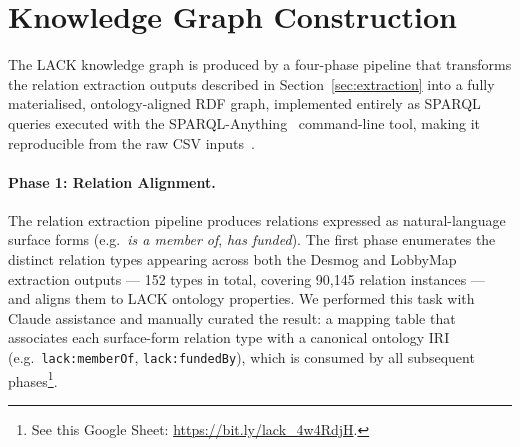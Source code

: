 \section{Knowledge Graph Construction}
\label{sec:construction}
The LACK knowledge graph is produced by a four-phase pipeline that transforms the relation extraction outputs described in Section~\ref{sec:extraction} into a fully materialised, ontology-aligned RDF graph, implemented entirely as SPARQL queries executed with the SPARQL-Anything~\cite{sparqlanything} command-line tool, making it reproducible from the raw CSV inputs~\cite{lack-kgc}.

\vspace{-0.3cm}\paragraph{Phase 1: Relation Alignment.}
\label{sec:construction:alignment}
The relation extraction pipeline produces relations expressed as natural-language surface forms (e.g.\ \emph{is a member of}, \emph{has funded}).
The first phase enumerates the distinct relation types appearing across both the Desmog and LobbyMap extraction outputs --- 152 types in total, covering 90,145 relation instances --- and aligns them to LACK ontology properties. We performed this task with Claude assistance and manually curated the result: a mapping table that associates each surface-form relation type with a canonical ontology IRI (e.g.\ \texttt{lack:memberOf}, \texttt{lack:fundedBy}), which is consumed by all subsequent phases\footnote{See this Google Sheet: \url{https://bit.ly/lack_4w4RdjH}.}.

